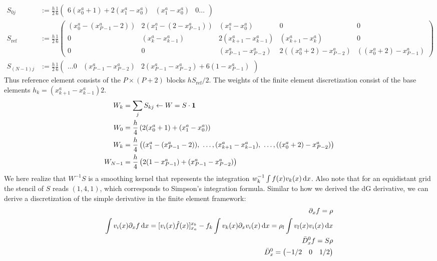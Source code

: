 \begin{align}
    S_{0j} &:= \frac{h}{2} \frac{1}{6}\begin{pmatrix}
        6(x^a_0+1) + 2(x^a_1-x^a_0) & (x^a_1-x^a_0) & 0 \ldots
    \end{pmatrix}
    \nonumber\\
    S_{\text{ref}} &:= \frac{h}{2}\frac{1}{6}\begin{pmatrix}
        (x^a_0-(x^a_{P-1}-2)) & 2(x^a_1 - (2-x^a_{P-1})) & (x^a_1 - x^a_0) & 0 & 0 \\
        0 & (x^a_{k} - x^a_{k-1}) & 2(x^a_{k+1}-x^a_{k-1}) & (x^a_{k+1} - x^a_k) & 0 \\
        0 & 0 & (x^a_{P-1} - x^a_{P-2}) & 2( (x^a_0+2) - x^a_{P-2}) & ((x^a_0+2)- x^a_{P-1})
    \end{pmatrix}
    \nonumber\\
    S_{(N-1)j} &:= \frac{h}{2} \frac{1}{6}\begin{pmatrix}
        \ldots 0 &(x^a_{P-1} - x^a_{P-2}) & 2(x^a_{P-1} - x^a_{P-2}) + 6( 1 - x^a_{P-1})
    \end{pmatrix}
\end{align}
Thus reference element consists of the $P\times(P+2)$ blocks $hS_{\text{ref}}/2$.
The weights of the finite element discretization consist of the base elements
$h_k = (x^a_{k+1}-x^a_{k-1})2$.
\begin{align} \label{eq:fem_weights}
    W_k &= \sum_j S_{kj}\leftarrow W = S\cdot \mathbf{1} \\
    W_0 &= \frac{h}{4}\left( 2(x^a_0+1) + (x^a_1-x^a_0)\right) \nonumber\\
    W_k &= \frac{h}{4}\left( (x^a_1 - (x^a_{P-1}-2)),\ \ldots, (x^a_{k+1}-x^a_{k-1}),\ \ldots, ( (x^a_0+2) - x^a_{P-2})\right)
    \nonumber\\
    W_{N-1} &= \frac{h}{4}\left( 2(1-x^a_{P-1}) + (x^a_{P-1}-x^a_{P-2})\right) \nonumber
\end{align}
We here realize that $W^{-1}S$  is a smoothing kernel that represents the
integration $w_k^{-1} \int f(x) v_k(x)\,\mathrm{d}x$.
Also note that for an equidistant grid the stencil of $S$ reads $(1,4,1)$, which
corresponds to Simpson's integration formula.
Similar to how we derived the dG derivative, we can derive a discretization of the
simple derivative in the finite element framework:
\begin{align}
    \partial_x f = \rho \nonumber\\
    \int v_i(x) \partial_x f \,\mathrm{d}x = [v_i(x) \hat f(x)]_{x_a}^{x_b} - f_k \int v_k(x)\partial_x v_i(x) \,\mathrm{d}x = \rho_l \int v_l(x) v_i(x)\,\mathrm{d}x \nonumber \\
    \bar D_x^0 f = S\rho \\
    \bar D_x^0 = \begin{pmatrix}
        -1/2 & 0 & 1/2
        \end{pmatrix}
\end{align}
